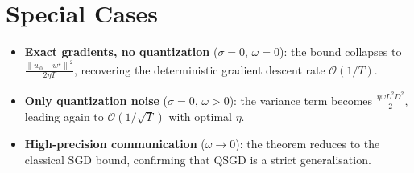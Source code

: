 \documentclass{article}
\newcommand{\norm}[1]{\left\|#1\right\|}
\begin{document}
\section*{Special Cases}
\begin{itemize}
\item \textbf{Exact gradients, no quantization} ($\sigma=0$, $\omega=0$): the bound collapses to $\frac{\norm{w_0-w^{\star}}^{2}}{2\eta T}$, recovering the deterministic gradient descent rate $\mathcal{O}(1/T)$.
\item \textbf{Only quantization noise} ($\sigma=0$, $\omega>0$): the variance term becomes $\frac{\eta\omega L^{2}D^{2}}{2}$, leading again to $\mathcal{O}(1/\sqrt{T})$ with optimal $\eta$.
\item \textbf{High‑precision communication} ($\omega\to0$): the theorem reduces to the classical SGD bound, confirming that QSGD is a strict generalisation.
\end{itemize}
\end{document}
